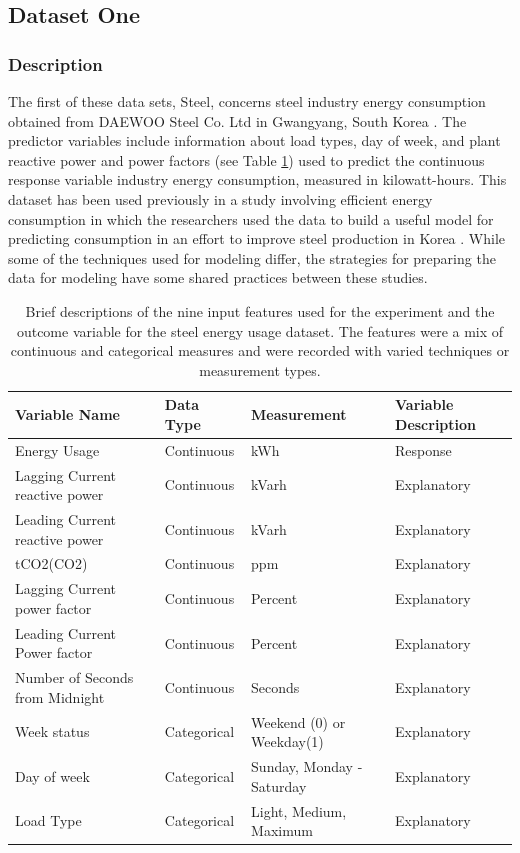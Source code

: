 \documentclass[10pt]{article}\usepackage[]{graphicx}\usepackage[]{xcolor}
\begin{document}
\subsection{Dataset One}
\subsubsection{Description}
The first of these data sets, Steel, concerns steel industry energy consumption obtained from DAEWOO Steel Co. Ltd in Gwangyang, South Korea \cite{Data:Steel}. The predictor variables include information about load types, day of week, and plant reactive power and power factors (see Table \ref{tab:steel_vars}) used to predict the continuous response variable industry energy consumption, measured in kilowatt-hours. This dataset has been used previously in a study involving efficient energy consumption in which the researchers used the data to build a useful model for predicting consumption in an effort to improve steel production in Korea \cite{RelatedWork:Steel}. While some of the techniques used for modeling differ, the strategies for preparing the data for modeling have some shared practices between these studies. \\

\begin{table}[h!]
  \begin{center}
    \begin{tabular}{l|l|l|l} %
      \textbf{Variable Name} & \textbf{Data Type} & \textbf{Measurement} & \textbf{Variable Description}\\
      \hline
      Energy Usage & Continuous & kWh & Response \\
      Lagging Current reactive power & Continuous & kVarh & Explanatory \\
      Leading Current reactive power & Continuous & kVarh & Explanatory  \\
      tCO2(CO2) & Continuous & ppm & Explanatory  \\
      Lagging Current power factor & Continuous & Percent & Explanatory  \\
      Leading Current Power factor & Continuous & Percent & Explanatory  \\
      Number of Seconds from Midnight & Continuous & Seconds & Explanatory  \\
      Week status & Categorical & Weekend (0) or Weekday(1) & Explanatory  \\
      Day of week & Categorical & Sunday, Monday - Saturday & Explanatory  \\
      Load Type & Categorical & Light, Medium, Maximum & Explanatory  \\
    \end{tabular}
    \caption{Brief descriptions of the nine input features used for the experiment and the outcome variable for the steel energy usage dataset. The features were a mix of continuous and categorical measures and were recorded with varied techniques or measurement types.}
    \label{tab:steel_vars}
  \end{center}
\end{table}
\end{document}
